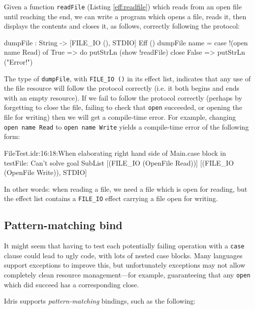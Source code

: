 Given a function \texttt{readFile} (Listing \ref{eff:readfile})
which reads from an open file until reaching the end, we can write a program
which opens a file, reads it, then displays the contents and closes it,
as follows, correctly following the protocol:

\begin{code}
dumpFile : String -> { [FILE_IO (), STDIO] } Eff ()
dumpFile name = case !(open name Read) of
                    True => do putStrLn (show !readFile)
                               close
                    False => putStrLn ("Error!")
\end{code}

\noindent
The type of \texttt{dumpFile}, with \texttt{FILE\_IO ()} in its effect
list, indicates that any use of the file resource will follow the protocol
correctly (i.e. it both begins and ends with an empty resource). If we fail
to follow the protocol correctly (perhaps by forgetting to close the file,
failing to check that \texttt{open} succeeded, or opening the file for writing)
then we will get a compile-time error. For example, changing \texttt{open name Read}
to \texttt{open name Write} yields a compile-time error of the following
form:

\begin{code}
FileTest.idr:16:18:When elaborating right hand side of Main.case 
block in testFile:
Can't solve goal 
        SubList [(FILE_IO (OpenFile Read))]
                [(FILE_IO (OpenFile Write)), STDIO]
\end{code}

\noindent
In other words: when reading a file, we need a file which is open for reading,
but the effect list contains a \texttt{FILE\_IO} effect carrying a file open
for writing.

\subsection{Pattern-matching bind}

It might seem that having to test each potentially failing operation with
a \texttt{case} clause could lead to ugly code, with lots of nested case
blocks. Many languages support exceptions to improve this, but unfortunately
exceptions may not allow completely clean resource management---for example,
guaranteeing that any \texttt{open} which did succeed has a corresponding close.

Idris supports \emph{pattern-matching} bindings, such as the following:

